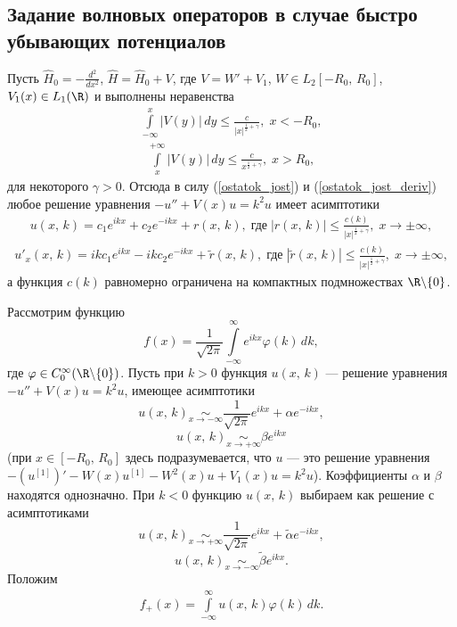 \documentclass[a4paper
]{article}
\begin{document}
\subsection{Задание волновых операторов в случае быстро убывающих
потенциалов} Пусть $\hat H_0=-\frac{d^2}{dx^2}$, $\hat H=\hat
H_0+V$, где $V= W'+V_1$, $W\in L_2[-R_0, \, R_0]$, $V_1(x)\in L_1(\R)$
и выполнены неравенства
\begin{align}
\label{potent_01}
\int \limits_{-\infty}^x|V(y)|\, dy\le \frac{c}{|x|^{\frac12+\gamma}},
\; x<-R_0,
\end{align}
\begin{align}
\label{potent_02}
\int \limits_x^{+\infty}|V(y)|\, dy\le \frac{c}{x^{\frac12+\gamma}},
\; x>R_0,
\end{align}
для некоторого $\gamma>0$.
Отсюда в силу (\ref{ostatok_jost}) и (\ref{ostatok_jost_deriv}) любое
решение уравнения $-u''+V(x)u=k^2u$ имеет асимптотики
\begin{align}
\label{ostatok_jost1}
u(x, \, k)=c_1e^{ikx}+c_2e^{-ikx}+r(x, \, k),
\; \text{где} \; |r(x, \, k)|\le \frac{c(k)}{|x|^{\frac12+\gamma}}, \;
x\rightarrow \pm \infty,
\end{align}
\begin{align}
\label{ostatok_jost1_deriv}
u'_x(x, \, k)=ikc_1e^{ikx}-ikc_2e^{-ikx}+\tilde r(x, \, k),
\; \text{где} \; |\tilde r(x, \, k)|\le \frac{c(k)}{|x|^{\frac12+
\gamma}}, \; x\rightarrow \pm \infty,
\end{align}
а функция $c(k)$ равномерно ограничена на компактных подмножествах
$\R\backslash \{0\}$. \par
Рассмотрим функцию $$f(x)=\frac{1}{\sqrt{2\pi}}\int \limits_{-\infty}
^\infty e^{ikx}\varphi(k)\, dk,$$
где $\varphi\in C_0^\infty(\R\backslash \{0\})$. Пусть при $k>0$ функция $u(x, \, k)$
--- решение уравнения $-u''+V(x)u=k^2u$, имеющее асимптотики
$$u(x, \, k)\underset{x\rightarrow -\infty}{\sim} \frac{1}{\sqrt{2\pi}}e^{ikx}+
\alpha e^{-ikx},$$ $$u(x, \, k)\underset{x\rightarrow
+\infty}{\sim} \beta e^{ikx}$$ (при $x\in [-R_0, \, R_0]$ здесь подразумевается, что
$u$ --- это решение уравнения $-(u^{[1]})'-W(x)u^{[1]}-W^2(x)u+V_1(x)u=k^2u$).
Коэффициенты $\alpha$ и $\beta$ находятся однозначно.
При $k<0$ функцию $u(x, \, k)$ выбираем как решение с асимптотиками
$$u(x, \, k)\underset{x\rightarrow +\infty}{\sim} \frac{1}{\sqrt{2\pi}}e^{ikx}+\tilde \alpha e^{-ikx},$$
$$u(x, \, k)\underset{x\rightarrow -\infty}{\sim} \tilde \beta e^{ikx}.$$
Положим
\begin{align}
\label{fplus}
f_+(x)=\int \limits_{-\infty}^\infty u(x, \, k)\varphi(k)\, dk.
\end{align}
\end{document}
